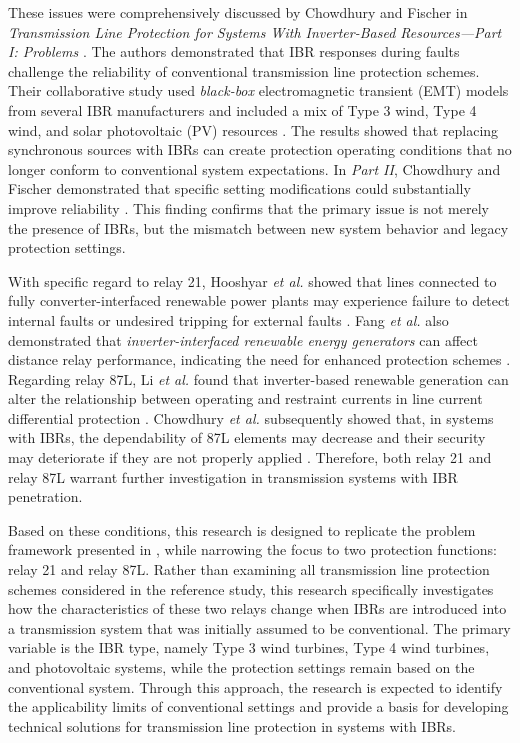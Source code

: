 These issues were comprehensively discussed by Chowdhury and Fischer in \textit{Transmission Line Protection for Systems With Inverter-Based Resources---Part I: Problems} \cite{chowdhury2021tlp1}. The authors demonstrated that IBR responses during faults challenge the reliability of conventional transmission line protection schemes. Their collaborative study used \textit{black-box} electromagnetic transient (EMT) models from several IBR manufacturers and included a mix of Type 3 wind, Type 4 wind, and solar photovoltaic (PV) resources \cite{chowdhury2021tlp1}. The results showed that replacing synchronous sources with IBRs can create protection operating conditions that no longer conform to conventional system expectations. In \textit{Part II}, Chowdhury and Fischer demonstrated that specific setting modifications could substantially improve reliability \cite{chowdhury2021tlp2}. This finding confirms that the primary issue is not merely the presence of IBRs, but the mismatch between new system behavior and legacy protection settings.

With specific regard to relay 21, Hooshyar \textit{et al.} showed that lines connected to fully converter-interfaced renewable power plants may experience failure to detect internal faults or undesired tripping for external faults \cite{hooshyar2015cirepp1}. Fang \textit{et al.} also demonstrated that \textit{inverter-interfaced renewable energy generators} can affect distance relay performance, indicating the need for enhanced protection schemes \cite{fang2019impact}. Regarding relay 87L, Li \textit{et al.} found that inverter-based renewable generation can alter the relationship between operating and restraint currents in line current differential protection \cite{li2017analysis}. Chowdhury \textit{et al.} subsequently showed that, in systems with IBRs, the dependability of 87L elements may decrease and their security may deteriorate if they are not properly applied \cite{chowdhury2023lcd}. Therefore, both relay 21 and relay 87L warrant further investigation in transmission systems with IBR penetration.

Based on these conditions, this research is designed to replicate the problem framework presented in \cite{chowdhury2021tlp1}, while narrowing the focus to two protection functions: relay 21 and relay 87L. Rather than examining all transmission line protection schemes considered in the reference study, this research specifically investigates how the characteristics of these two relays change when IBRs are introduced into a transmission system that was initially assumed to be conventional. The primary variable is the IBR type, namely Type 3 wind turbines, Type 4 wind turbines, and photovoltaic systems, while the protection settings remain based on the conventional system. Through this approach, the research is expected to identify the applicability limits of conventional settings and provide a basis for developing technical solutions for transmission line protection in systems with IBRs.

